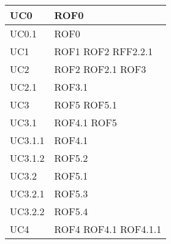 \documentclass[../AnalisideiRequisiti.tex]{subfiles}
\begin{document}
\begin{longtable}{| p{4cm} | p{4cm} |}
	\hline
		\newline UC0 &  \newline ROF0 \\[1em]
	\hline
		\newline UC0.1 &  \newline ROF0 \\[1em]
	\hline
		\newline UC1 &  \newline ROF1 \newline ROF2 \newline RFF2.2.1   \\[1em]	
		\hline
		\newline UC2 &  \newline ROF2 \newline ROF2.1 \newline ROF3 \\[1em]	
		\hline
		\newline UC2.1 &  \newline ROF3.1 \\[1em]	
		\hline		
		\newline UC3 &  \newline ROF5 \newline ROF5.1 \\[1em]	
		\hline
		\newline UC3.1 &  \newline ROF4.1 \newline ROF5  \\[1em]
		\hline
		\newline UC3.1.1 &  \newline ROF4.1 \\[1em]
		\hline
		\newline UC3.1.2 &  \newline ROF5.2 \\[1em]
		\hline
		\newline UC3.2 &  \newline ROF5.1 \\[1em]
		\hline
		\newline UC3.2.1 &  \newline ROF5.3 \\[1em]
		\hline
		\newline UC3.2.2 &  \newline ROF5.4 \\[1em]
		\hline
		\newline UC4 &  \newline ROF4 \newline ROF4.1 \newline ROF4.1.1 \\[1em]

\end{longtable}
\end{document}
